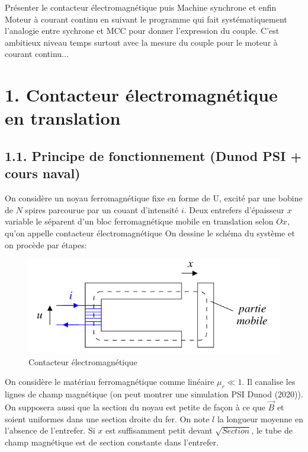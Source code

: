 \documentclass[french, a4paper, 10pt, twocolumn, landscape]{article}
\begin{document}
Présenter le contacteur électromagnétique puis Machine synchrone et enfin Moteur à courant continu en suivant le programme qui fait systématiquement l'analogie entre sychrone et MCC pour donner l'expression du couple. C'est ambitieux niveau temps surtout avec la mesure du couple pour le moteur à courant continu...

\section*{1. Contacteur électromagnétique en translation}

\subsection*{1.1. Principe de fonctionnement (Dunod PSI + cours naval)}

On considère un noyau ferromagnétique fixe en forme de U, excité par une bobine de $N$ spires parcourue par un couant d'intensité $i$. Deux entrefers d'épaisseur $x$ variable le séparent d'un bloc ferromagnétique mobile en translation selon $Ox$, qu'on appelle \og{}contacteur électromagnétique\fg{}\medskip
On dessine le schéma du système et on procède par étapes:

\begin{figure}[ht]
    \centering
    \includegraphics[width=.5\linewidth]{./figures/ContacteurElectromagnetique.png}
    \caption{Contacteur électromagnétique}
\end{figure} 

On considère le matériau  ferromagnétique comme linéaire $\mu_r\ll 1$. Il canalise les lignes de champ magnétique (on peut montrer une simulation PSI Dunod (2020)). On supposera aussi que la section du noyau est petite de façon à ce que $\vec{B}$ et  soient uniformes dans une section droite du fer. On note $l$ la longueur moyenne en l'absence de l'entrefer. Si $x$ est suffisamment petit devant $\sqrt{Section}$, le tube de champ magnétique est de section constante dans l'entrefer.
\end{document}
